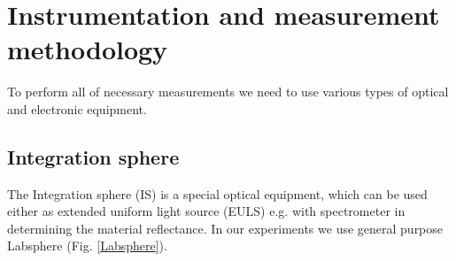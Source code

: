 
\chapter{Instrumentation and measurement methodology}
To perform all of necessary measurements we need to use various types of optical and electronic equipment.
\section{Integration sphere}
The Integration sphere (IS) is a special optical equipment, which can be used either as extended uniform light source (EULS) e.g. with spectrometer in determining the material reflectance. In our experiments we use general purpose Labsphere (Fig. \ref{Labsphere}).

